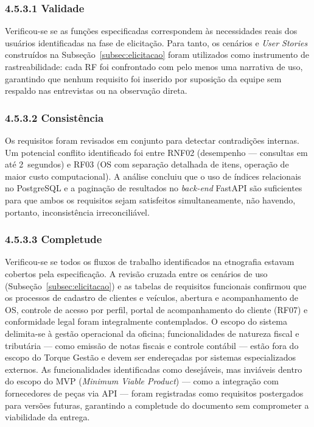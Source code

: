 \documentclass[12pt, a4paper]{article}
\begin{document}
\subsubsection{4.5.3.1 Validade}

Verificou-se se as funções especificadas correspondem às necessidades reais dos
usuários identificadas na fase de elicitação. Para tanto, os cenários e
\textit{User Stories} construídos na
Subseção~\ref{subsec:elicitacao} foram utilizados como instrumento de
rastreabilidade: cada RF foi confrontado com pelo menos uma narrativa de uso,
garantindo que nenhum requisito foi inserido por suposição da equipe sem
respaldo nas entrevistas ou na observação direta.

\subsubsection{4.5.3.2 Consistência}

Os requisitos foram revisados em conjunto para detectar contradições internas.
Um potencial conflito identificado foi entre RNF02 (desempenho — consultas em
até 2~segundos) e RF03 (OS com separação detalhada de itens, operação de maior
custo computacional). A análise concluiu que o uso de índices relacionais no
PostgreSQL e a paginação de resultados no \textit{back-end} FastAPI são
suficientes para que ambos os requisitos sejam satisfeitos simultaneamente,
não havendo, portanto, inconsistência irreconciliável.

\subsubsection{4.5.3.3 Completude}

Verificou-se se todos os fluxos de trabalho identificados na etnografia estavam
cobertos pela especificação. A revisão cruzada entre os cenários de uso
(Subseção~\ref{subsec:elicitacao}) e as tabelas de requisitos funcionais
confirmou que os processos de cadastro de clientes e veículos, abertura e
acompanhamento de OS, controle de acesso por perfil, portal de acompanhamento
do cliente (RF07) e conformidade legal foram integralmente contemplados.
O escopo do sistema delimita-se à gestão operacional da oficina; funcionalidades
de natureza fiscal e tributária — como emissão de notas fiscais e controle
contábil — estão fora do escopo do Torque Gestão e devem ser endereçadas por
sistemas especializados externos. As funcionalidades identificadas como
desejáveis, mas inviáveis dentro do escopo do MVP (\textit{Minimum Viable
Product}) — como a integração com fornecedores de peças via API — foram
registradas como requisitos postergados para versões futuras, garantindo a
completude do documento sem comprometer a viabilidade da entrega.
\end{document}
